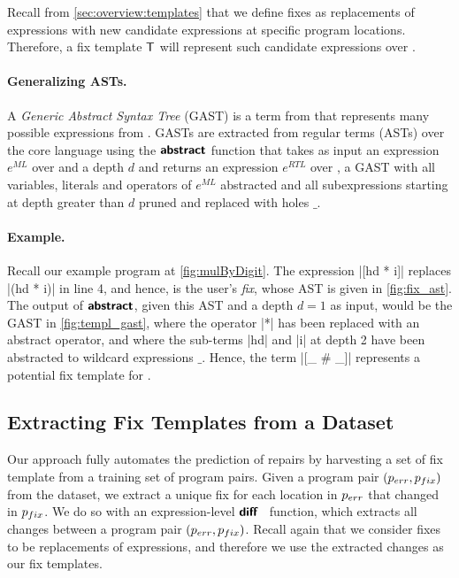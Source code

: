 Recall from \autoref{sec:overview:templates} that we define fixes as
replacements of expressions with new candidate expressions at specific 
program locations. Therefore, a fix template $\mathsf{T}$ will represent such 
candidate expressions over \repairLang.

\paragraph{Generalizing ASTs.}
A \emph{Generic Abstract Syntax Tree} (GAST) is a term from \repairLang that 
represents many possible expressions from \lang. GASTs are extracted from regular 
terms (ASTs) over the core language \lang using the $\bm{\mathsf{abstract}}$ function that takes 
as input an expression $e^{ML}$ over \lang and a depth $d$ and returns an expression 
$e^{RTL}$ over \repairLang, \ie a GAST with all variables, literals and operators of 
$e^{ML}$ abstracted and all subexpressions starting at depth greater than $d$ pruned 
and replaced with holes $\_$.



\paragraph{Example.}
Recall our example program \mbd at \autoref{fig:mulByDigit}. 
%
The expression |[hd * i]| replaces |(hd * i)| in line 4, and hence, is the user's \emph{fix},
whose AST is given in \autoref{fig:fix_ast}. 
%
The output of $\bm{\mathsf{abstract}}$, given this AST and a depth $d = 1$ as input, would be the 
GAST in \autoref{fig:templ_gast}, where the operator |*| has been replaced with an 
abstract operator, and where the sub-terms |hd| and |i| at depth 2 have been 
abstracted to wildcard expressions $\_$.
%
Hence, the \repairLang term |[_ # _]| represents a potential fix template for \mbd.

\subsection{Extracting Fix Templates from a Dataset}
\label{sec:templ-cluster:templates}

Our approach fully automates the prediction of repairs 
by harvesting a set of fix template from a training set 
of program pairs.
%
Given a program pair $(p_{err}, p_{fix})$ from the dataset, 
we extract a unique fix for each location in $p_{err}$ 
that changed in $p_{fix}$. 
%
We do so with an expression-level $\bm{\mathsf{diff}}$~\citep{Lempsink2009-xf} 
function, which extracts all changes between a program pair 
$(p_{err}, p_{fix})$. 
%
Recall again that we consider fixes to be replacements 
of expressions, and therefore we use the extracted
changes as our fix templates.

